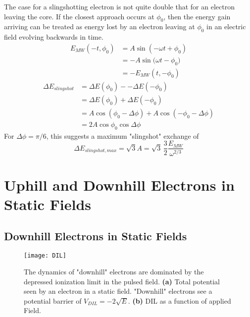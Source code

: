 \documentclass[aps,pra,preprint,groupedaddress]{revtex4-1}
\begin{document}
The case for a slingshotting electron is not quite double that for an electron leaving the core. If the closest approach occurs at $\phi_0$, then the energy gain arriving can be treated as energy lost by an electron leaving at $\phi_0$ in an electric field evolving backwards in time.
\begin{align*}
E_{MW}(-t,\phi_0) & = A \sin{(-\omega t + \phi_0)} \\
 & = -A\sin({\omega t - \phi_0)} \\
 & = -E_{MW}(t, -\phi_0)
\end{align*}
\begin{align*}
\Delta E_{slingshot} & = \Delta E(\phi_0) - -\Delta E(-\phi_0) \\
 & = \Delta E(\phi_0) + \Delta E(-\phi_0) \\
 & = A \cos{(\phi_0 - \Delta \phi)} + A \cos{(-\phi_0 - \Delta \phi)} \\
 & = 2 A \cos{\phi_0} \cos{\Delta \phi}
\end{align*}
For $\Delta \phi = \pi/6$, this suggests a maximum "slingshot" exchange of
\begin{equation*}
\Delta E_{slingshot,max} = \sqrt{3} A = \sqrt{3} \, \frac{3}{2} \frac{E_{MW}}{\omega^{2/3}}
\end{equation*}

\section{\label{sec:static} Uphill and Downhill Electrons in Static Fields}

\subsection{\label{sec:DHstatic} Downhill Electrons in Static Fields}

\begin{figure}
\texttt{[image: DIL]}
\caption{\label{fig:DIL} The dynamics of "downhill" electrons are dominated by the depressed ionization limit in the pulsed field. \textbf{(a)} Total potential seen by an electron in a static field. "Downhill" electrons see a potential barrier of $V_{DIL} = -2\sqrt{E}$. \textbf{(b)} DIL as a function of applied Field.}
\end{figure}
\end{document}
